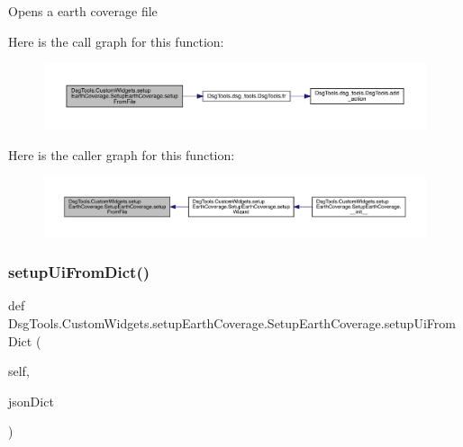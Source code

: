 \begin{DoxyVerb}Opens a earth coverage file
\end{DoxyVerb}
 Here is the call graph for this function\+:
\nopagebreak
\begin{figure}[H]
\begin{center}
\leavevmode
\includegraphics[width=350pt]{class_dsg_tools_1_1_custom_widgets_1_1setup_earth_coverage_1_1_setup_earth_coverage_a54d2b5406367f9ad7310bb422bb1f702_cgraph}
\end{center}
\end{figure}
Here is the caller graph for this function\+:
\nopagebreak
\begin{figure}[H]
\begin{center}
\leavevmode
\includegraphics[width=350pt]{class_dsg_tools_1_1_custom_widgets_1_1setup_earth_coverage_1_1_setup_earth_coverage_a54d2b5406367f9ad7310bb422bb1f702_icgraph}
\end{center}
\end{figure}
\mbox{\label{class_dsg_tools_1_1_custom_widgets_1_1setup_earth_coverage_1_1_setup_earth_coverage_a52b6b311cf997811b741f9cd700cad79}} 
\subsubsection{\texorpdfstring{setup\+Ui\+From\+Dict()}{setupUiFromDict()}}
{\footnotesize\ttfamily def Dsg\+Tools.\+Custom\+Widgets.\+setup\+Earth\+Coverage.\+Setup\+Earth\+Coverage.\+setup\+Ui\+From\+Dict (\begin{DoxyParamCaption}\item[{}]{self,  }\item[{}]{json\+Dict }\end{DoxyParamCaption})}

